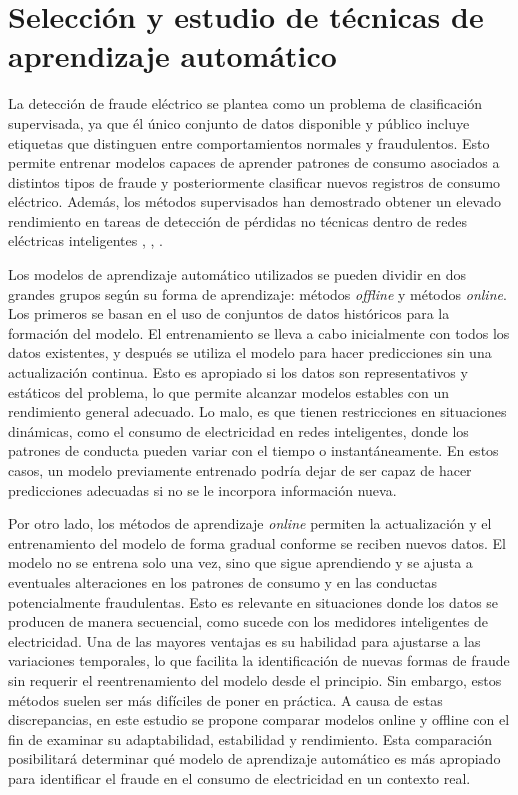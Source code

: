 \documentclass[12pt,a4paper]{report}
\begin{document}
\section{Selección y estudio de técnicas de aprendizaje automático}

La detección de fraude eléctrico se plantea como un problema de clasificación supervisada, ya que él único conjunto de datos disponible y público incluye etiquetas que distinguen entre comportamientos normales y fraudulentos. Esto permite entrenar modelos capaces de aprender patrones de consumo asociados a distintos tipos de fraude y posteriormente clasificar nuevos registros de consumo eléctrico. Además, los métodos supervisados han demostrado obtener un elevado rendimiento en tareas de detección de pérdidas no técnicas dentro de redes eléctricas inteligentes \cite{articulo1}, \cite{articulo2}, \cite{articulo3}.

Los modelos de aprendizaje automático utilizados se pueden dividir en dos grandes grupos según su forma de aprendizaje: métodos \emph{offline} y métodos \emph{online}. Los primeros se basan en el uso de conjuntos de datos históricos para la formación del modelo. El entrenamiento se lleva a cabo inicialmente con todos los datos existentes, y después se utiliza el modelo para hacer predicciones sin una actualización continua. Esto es apropiado si los datos son representativos y estáticos del problema, lo que permite alcanzar modelos estables con un rendimiento general adecuado. Lo malo, es que tienen restricciones en situaciones dinámicas, como el consumo de electricidad en redes inteligentes, donde los patrones de conducta pueden variar con el tiempo o instantáneamente. En estos casos, un modelo previamente entrenado podría dejar de ser capaz de hacer predicciones adecuadas si no se le incorpora información nueva.

Por otro lado, los métodos de aprendizaje \emph{online} permiten la actualización y el entrenamiento del modelo de forma gradual conforme se reciben nuevos datos. El modelo no se entrena solo una vez, sino que sigue aprendiendo y se ajusta a eventuales alteraciones en los patrones de consumo y en las conductas potencialmente fraudulentas. Esto es relevante en situaciones donde los datos se producen de manera secuencial, como sucede con los medidores inteligentes de electricidad. Una de las mayores ventajas es su habilidad para ajustarse a las variaciones temporales, lo que facilita la identificación de nuevas formas de fraude sin requerir el reentrenamiento del modelo desde el principio. Sin embargo, estos métodos suelen ser más difíciles de poner en práctica. A causa de estas discrepancias, en este estudio se propone comparar modelos online y offline con el fin de examinar su adaptabilidad, estabilidad y rendimiento. Esta comparación posibilitará determinar qué modelo de aprendizaje automático es más apropiado para identificar el fraude en el consumo de electricidad en un contexto real.
\end{document}

